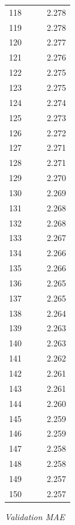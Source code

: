 \documentclass[12pt]{article}
\begin{document}
\begin{center}
\begin{tabular}{|l || l| l| l|}
            118 & & & 2.278 \\
            119 & & & 2.278 \\
            120 & & & 2.277 \\
            121 & & & 2.276 \\
            122 & & & 2.275 \\
            123 & & & 2.275 \\
            124 & & & 2.274 \\
            125 & & & 2.273 \\
            126 & & & 2.272 \\
            127 & & & 2.271 \\
            128 & & & 2.271 \\
            129 & & & 2.270 \\
            130 & & & 2.269 \\
            131 & & & 2.268 \\
            132 & & & 2.268 \\
            133 & & & 2.267 \\
            134 & & & 2.266 \\
            135 & & & 2.266 \\
            136 & & & 2.265 \\
            137 & & & 2.265 \\
            138 & & & 2.264 \\
            139 & & & 2.263 \\
            140 & & & 2.263 \\
            141 & & & 2.262 \\
            142 & & & 2.261 \\
            143 & & & 2.261 \\
            144 & & & 2.260 \\
            145 & & & 2.259 \\
            146 & & & 2.259 \\
            147 & & & 2.258 \\
            148 & & & 2.258 \\
            149 & & & 2.257 \\
            150 & & & 2.257 \\
            \hline
          \end{tabular}
          \normalsize
          \newpage
          \textit{Validation MAE}


\end{center}
\end{document}

